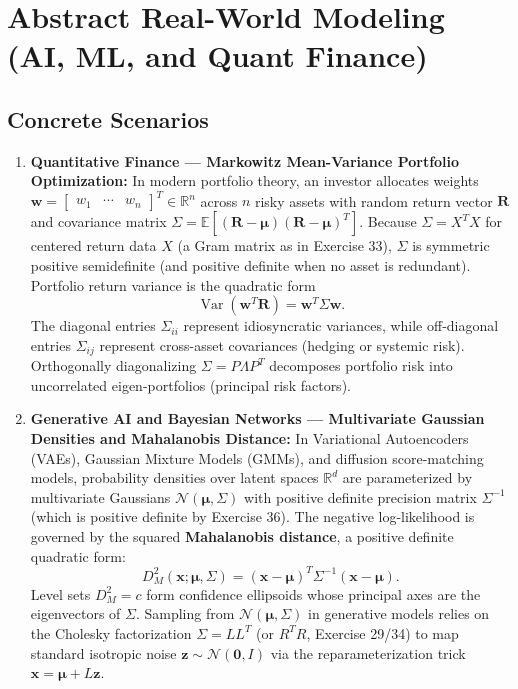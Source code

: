 \documentclass[11pt, letterpaper]{article}
\theoremstyle{definition}
\theoremstyle{remark}
\begin{document}
\newpage

\section{Abstract Real-World Modeling (AI, ML, and Quant Finance)}

\subsection{Concrete Scenarios}

\begin{enumerate}
    \item \textbf{Quantitative Finance --- Markowitz Mean-Variance Portfolio Optimization:}
    In modern portfolio theory, an investor allocates weights $\mathbf{w} = \begin{bmatrix} w_1 & \cdots & w_n \end{bmatrix}^T \in \mathbb{R}^n$ across $n$ risky assets with random return vector $\mathbf{R}$ and covariance matrix $\Sigma = \mathbb{E}[(\mathbf{R} - \boldsymbol{\mu})(\mathbf{R} - \boldsymbol{\mu})^T]$. Because $\Sigma = X^T X$ for centered return data $X$ (a Gram matrix as in Exercise 33), $\Sigma$ is symmetric positive semidefinite (and positive definite when no asset is redundant). Portfolio return variance is the quadratic form
    \[
    \operatorname{Var}(\mathbf{w}^T \mathbf{R}) = \mathbf{w}^T \Sigma \mathbf{w}.
    \]
    The diagonal entries $\Sigma_{ii}$ represent idiosyncratic variances, while off-diagonal entries $\Sigma_{ij}$ represent cross-asset covariances (hedging or systemic risk). Orthogonally diagonalizing $\Sigma = P \Lambda P^T$ decomposes portfolio risk into uncorrelated eigen-portfolios (principal risk factors).

    \item \textbf{Generative AI and Bayesian Networks --- Multivariate Gaussian Densities and Mahalanobis Distance:}
    In Variational Autoencoders (VAEs), Gaussian Mixture Models (GMMs), and diffusion score-matching models, probability densities over latent spaces $\mathbb{R}^d$ are parameterized by multivariate Gaussians $\mathcal{N}(\boldsymbol{\mu}, \Sigma)$ with positive definite precision matrix $\Sigma^{-1}$ (which is positive definite by Exercise 36). The negative log-likelihood is governed by the squared \textbf{Mahalanobis distance}, a positive definite quadratic form:
    \[
    D_M^2(\mathbf{x}; \boldsymbol{\mu}, \Sigma) = (\mathbf{x} - \boldsymbol{\mu})^T \Sigma^{-1} (\mathbf{x} - \boldsymbol{\mu}).
    \]
    Level sets $D_M^2 = c$ form confidence ellipsoids whose principal axes are the eigenvectors of $\Sigma$. Sampling from $\mathcal{N}(\boldsymbol{\mu}, \Sigma)$ in generative models relies on the Cholesky factorization $\Sigma = L L^T$ (or $R^T R$, Exercise 29/34) to map standard isotropic noise $\mathbf{z} \sim \mathcal{N}(\mathbf{0}, I)$ via the reparameterization trick $\mathbf{x} = \boldsymbol{\mu} + L\mathbf{z}$.


\end{enumerate}
\end{document}
